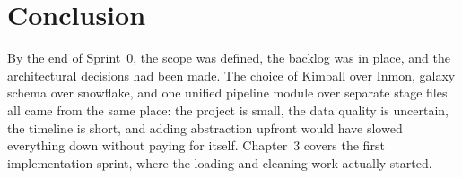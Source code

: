 \documentclass[12pt, a4paper]{report}
\begin{document}
\section{Conclusion}

By the end of Sprint~0, the scope was defined, the backlog was in place,
and the architectural decisions had been made. The choice of Kimball over
Inmon, galaxy schema over snowflake, and one unified pipeline module over
separate stage files all came from the same place: the project is small,
the data quality is uncertain, the timeline is short, and adding abstraction
upfront would have slowed everything down without paying for itself.
Chapter~3 covers the first implementation sprint, where the loading and
cleaning work actually started.

\end{document}
